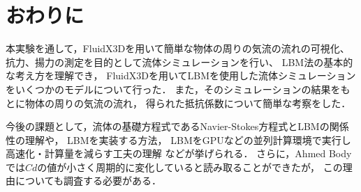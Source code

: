\documentclass[main]{subfiles}
\begin{document}
\chapter{おわりに}
本実験を通して，FluidX3Dを用いて簡単な物体の周りの気流の流れの可視化、抗力、揚力の測定を目的として流体シミュレーションを行い、
LBM法の基本的な考え方を理解でき，
FluidX3Dを用いてLBMを使用した流体シミュレーションをいくつかのモデルについて行った．
また，そのシミュレーションの結果をもとに物体の周りの気流の流れ，
得られた抵抗係数について簡単な考察をした．

今後の課題として，流体の基礎方程式であるNavier-Stokes方程式とLBMの関係性の理解や，
LBMを実装する方法，
LBMをGPUなどの並列計算環境で実行し高速化・計算量を減らす工夫の理解
などが挙げられる．
さらに，Ahmed Bodyでは$Cd$の値が小さく周期的に変化していると読み取ることができたが，
この理由についても調査する必要がある．
\end{document}
